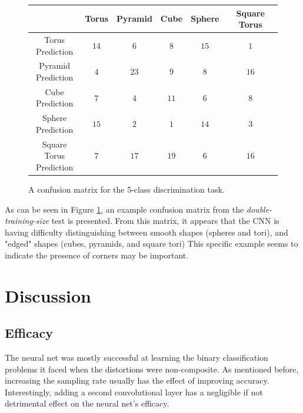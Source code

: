 \documentclass{article}
\begin{document}
\begin{figure}
\begin{center}
    \begin{tabular}{|c|c|c|c|c|c|}
    \hline
    &Torus & Pyramid & Cube & Sphere & Square Torus \\ [0.5ex]
    \hline
    \shortstack{Torus \\Prediction}        & $14$  & $6$     & $8$  & $15$   & $1$  \\
    \hline
    \shortstack{Pyramid \\Prediction}     & $4$   & $23$    & $9$  & $8$    & $16$ \\
    \hline
    \shortstack{Cube \\Prediction}        & $7$   & $4$     & $11$ & $6$    & $8$  \\
    \hline
    \shortstack{Sphere \\Prediction}       & $15$  & $2$     & $1$  & $14$   & $3$  \\
    \hline
    \shortstack{Square Torus \\Prediction} & $7$   & $17$    & $19$ & $6$    & $16$ \\ [1ex]
    \hline
   \end{tabular}
\end{center}
\caption{A confusion matrix for the 5-class discrimination task.}
\label{multiclassconfusion}
\end{figure}

As can be seen in Figure \ref{multiclassconfusion}, an example confusion matrix from the \textit{double-training-size} test is presented.
From this matrix, it appears that the CNN is having difficulty distinguishing between smooth shapes (spheres and tori), and "edged" shapes (cubes, pyramids, and square tori)
This specific example seems to indicate the presence of corners may be important.

\section{Discussion}

\subsection{Efficacy}

The neural net was mostly successful at learning the binary classification problems it faced when the distortions were non-composite.
As mentioned before, increasing the sampling rate usually has the effect of improving accuracy. Interestingly, adding a second convolutional
layer has a negligible if not detrimental effect on the neural net's efficacy.
\end{document}
